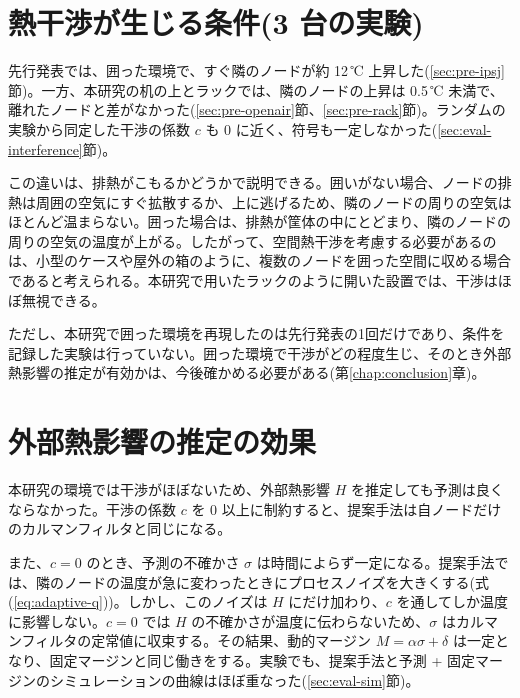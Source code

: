 \section{熱干渉が生じる条件(3 台の実験)}\label{sec:disc-interference}
先行発表では、囲った環境で、すぐ隣のノードが約 12\,℃ 上昇した(\ref{sec:pre-ipsj}節)。一方、本研究の机の上とラックでは、隣のノードの上昇は 0.5\,℃ 未満で、離れたノードと差がなかった(\ref{sec:pre-openair}節、\ref{sec:pre-rack}節)。ランダムの実験から同定した干渉の係数 $c$ も 0 に近く、符号も一定しなかった(\ref{sec:eval-interference}節)。

この違いは、排熱がこもるかどうかで説明できる。囲いがない場合、ノードの排熱は周囲の空気にすぐ拡散するか、上に逃げるため、隣のノードの周りの空気はほとんど温まらない。囲った場合は、排熱が筐体の中にとどまり、隣のノードの周りの空気の温度が上がる。したがって、空間熱干渉を考慮する必要があるのは、小型のケースや屋外の箱のように、複数のノードを囲った空間に収める場合であると考えられる。本研究で用いたラックのように開いた設置では、干渉はほぼ無視できる。

ただし、本研究で囲った環境を再現したのは先行発表の1回だけであり、条件を記録した実験は行っていない。囲った環境で干渉がどの程度生じ、そのとき外部熱影響の推定が有効かは、今後確かめる必要がある(第\ref{chap:conclusion}章)。

\section{外部熱影響の推定の効果}\label{sec:disc-h}
本研究の環境では干渉がほぼないため、外部熱影響 $H$ を推定しても予測は良くならなかった。干渉の係数 $c$ を 0 以上に制約すると、提案手法は自ノードだけのカルマンフィルタと同じになる。

また、$c = 0$ のとき、予測の不確かさ $\sigma$ は時間によらず一定になる。提案手法では、隣のノードの温度が急に変わったときにプロセスノイズを大きくする(式(\ref{eq:adaptive-q}))。しかし、このノイズは $H$ にだけ加わり、$c$ を通してしか温度に影響しない。$c = 0$ では $H$ の不確かさが温度に伝わらないため、$\sigma$ はカルマンフィルタの定常値に収束する。その結果、動的マージン $M = \alpha\sigma + \delta$ は一定となり、固定マージンと同じ働きをする。実験でも、提案手法と予測 + 固定マージンのシミュレーションの曲線はほぼ重なった(\ref{sec:eval-sim}節)。


